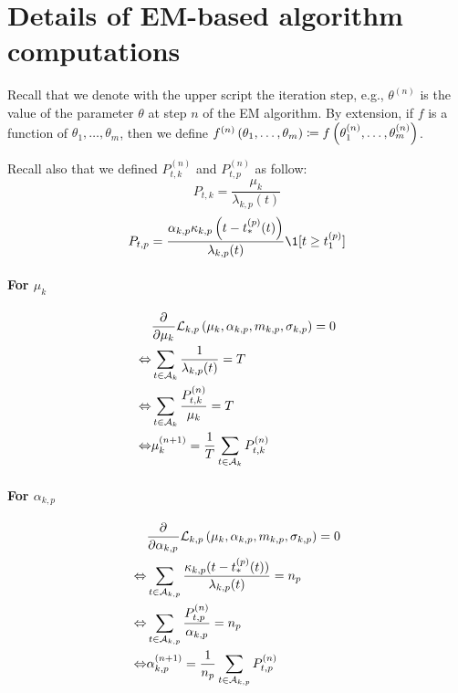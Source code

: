 \section{Details of EM-based algorithm computations}\label{annexe:details_em}

Recall that we denote with the upper script the iteration step, e.g., $\theta^{(n)}$ is the value of the parameter $\theta$ at step $n$ of the EM algorithm.
By extension, if $f$ is a function of $\theta_1, \dots, \theta_m$, then we define $f^{(n)}\left( \theta_1, \dots, \theta_m \right) \coloneqq f\left( \theta_1^{(n)}, \dots, \theta_m^{(n)} \right)$.

Recall also that we defined $P_{t,k}^{(n)}$ and $P_{t,p}^{(n)}$ as follow:
\begin{equation*}
    P_{t,k} = \frac{\mu_k}{\lambda_{k,p}(t)}
\end{equation*}
\begin{equation*}
    P_{t,p} = \frac{\alpha_{k,p}\kappa_{k,p}\pars{t - t_*^{(p)}(t)}}{\lambda_{k,p}(t)}\1[t \geq t_1^{(p)}]
\end{equation*}

\paragraph{For $\mu_k$}
\begin{equation}
\begin{split}
    & \frac{\partial^{}}{\partial {\mu_k}^{}}\mathcal{L}_{k,p}\left( \mu_k, \alpha_{k,p}, m_{k,p}, \sigma_{k,p} \right) = 0 \\
    \Leftrightarrow &\sum_{t\in\mathcal{A}_k}\frac{1}{\lambda_{k,p}(t)} = T \\
    \Leftrightarrow &\sum_{t\in\mathcal{A}_k}\frac{P_{t,k}^{(n)}}{\mu_k} = T \\
    \Leftrightarrow &\mu_k^{(n+1)} = \frac{1}{T} \sum_{t\in\mathcal{A}_k} P_{t,k}^{(n)}
\end{split}
\end{equation}

\paragraph{For $\alpha_{k,p}$}
\begin{equation}
\begin{split}
    & \frac{\partial^{}}{\partial {\alpha_{k,p}}^{}}\mathcal{L}_{k,p}\left( \mu_k, \alpha_{k,p}, m_{k,p}, \sigma_{k,p} \right) = 0 \\
    \Leftrightarrow &\sum_{t\in\mathcal{A}_{k,p}}\frac{\kappa_{k,p}(t - t_*^{(p)}(t))}{\lambda_{k,p}(t)} = n_p \\
    \Leftrightarrow &\sum_{t\in\mathcal{A}_{k,p}}\frac{P_{t,p}^{(n)}}{\alpha_{k,p}} = n_p \\
    \Leftrightarrow &\alpha_{k,p}^{(n+1)} = \frac{1}{n_p} \sum_{t\in\mathcal{A}_{k,p}} P_{t,p}^{(n)}
\end{split}
\end{equation}

